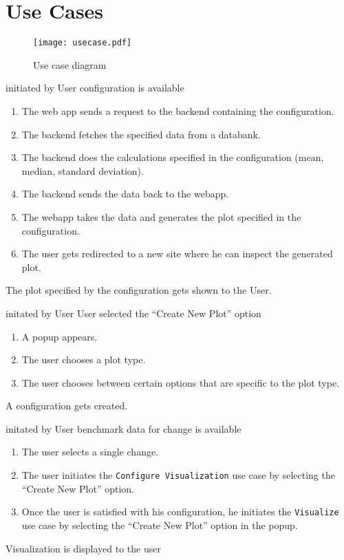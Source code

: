 \section{Use Cases}

\begin{figure}[H]
    \texttt{[image: usecase.pdf]}
    \caption{Use case diagram}
    \label{fig:usecase}
\end{figure}

{initiated by User}
{\gls{configuration} is available}
{\begin{enumerate}
    \item The web app sends a request to the backend containing the \gls{configuration}.
    \item The backend fetches the specified data from a databank.
    \item The backend does the calculations specified in the \gls{configuration} (mean, median, standard deviation).
    \item The backend sends the data back to the webapp.
    \item The webapp takes the data and generates the plot specified in the \gls{configuration}.
    \item The user gets redirected to a new site where he can inspect the generated plot.
\end{enumerate}}
{The plot specified by the \gls{configuration} gets shown to the User.}

\bigskip

{initated by User}
{User selected the \enquote{Create New Plot} option}
{\begin{enumerate}
    \item A popup appears.
    \item The user chooses a plot type.
    \item The user chooses between certain options that are specific to the plot type.
\end{enumerate}}
{A \gls{configuration} gets created.}

\bigskip

{initated by User}
{benchmark data for change is available}
{\begin{enumerate}
    \item The user selects a single change.
    \item The user initiates the \texttt{Configure Visualization} use case by selecting the \enquote{Create New Plot} option.
    \item Once the user is satisfied with his \gls{configuration}, he initiates the \texttt{Visualize} use case by selecting the \enquote{Create New Plot} option in the popup.
\end{enumerate}}
{Visualization is displayed to the user}

